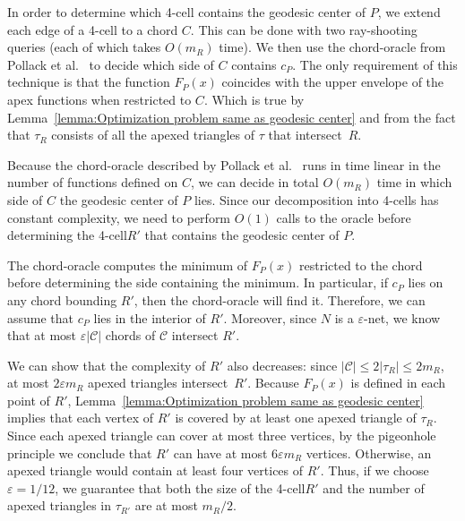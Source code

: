 \documentclass[a4paper,UKenglish]{lipics}
\newcommand{\F}[2]{\ensuremath{F_{\scriptscriptstyle #1}(#2)}}
\newcommand{\cp}{\ensuremath{c_P}}
\newcommand{\m}{\ensuremath{m_{\scriptscriptstyle R}}}
\newcommand{\reg}{\ensuremath{R'}}
\newcommand{\tcell}{4-cell\xspace}
\newcommand{\tcells}{4-cells\xspace}
\begin{document}
In order to determine which \tcell contains the geodesic center of $P$, 
we extend each edge of a \tcell to a chord $C$. 
This can be done with two ray-shooting queries (each of which takes $O(\m)$ time).
We then use the chord-oracle from Pollack et al.~\cite[Section~3]{pollackComputingCenter} to decide which side of $C$ contains $\cp$.
The only requirement of this technique is that the function $\F{P}{x}$ coincides with the upper envelope of the apex functions when restricted to $C$.
Which is true by Lemma~\ref{lemma:Optimization problem same as geodesic center} and from the fact that $\tau_R$ consists of all the apexed triangles of $\tau$ that intersect~$R$.

Because the chord-oracle described by Pollack et al.~\cite[Section~3]{pollackComputingCenter} runs in time linear in the number of functions defined on $C$, we can decide in total $O(\m)$ time in which side of $C$ the geodesic center of $P$ lies. 
Since our decomposition into \tcells has constant complexity, 
we need to perform $O(1)$ calls to the oracle before determining the \tcell $\reg$ that contains the geodesic center of $P$. 

The chord-oracle computes the minimum of $\F{P}{x}$ restricted to the chord before determining the side containing the minimum. In particular, if $\cp$ lies on any chord bounding $\reg$, then the chord-oracle will find it. 
Therefore, we can assume that $\cp$ lies in the interior of $\reg$. Moreover, since $N$ is a $\varepsilon$-net, we know that at most $\varepsilon |\mathcal C|$ chords of $\mathcal C$ intersect $\reg$.

We can show that the complexity of $\reg$ also decreases: since $|\mathcal C| \leq 2|\tau_R| \leq 2\m$, at most $2\varepsilon \m$ apexed triangles intersect~$\reg$. Because $\F{P}{x}$ is defined in each point of $R'$, Lemma~\ref{lemma:Optimization problem same as geodesic center} implies that each vertex of $\reg$ is covered by at least one apexed triangle of $\tau_R$. 
Since each apexed triangle can cover at most three vertices, 
by the pigeonhole principle we conclude that $\reg$ can have at most $6 \varepsilon \m$ vertices. Otherwise, an apexed triangle would contain at least four vertices of $\reg$.
Thus, if we choose $\varepsilon = 1/12$, we guarantee that both the size of the \tcell $\reg$ and the number of apexed triangles in $\tau_{\reg}$ are at most $\m/2$. 

\end{document}
